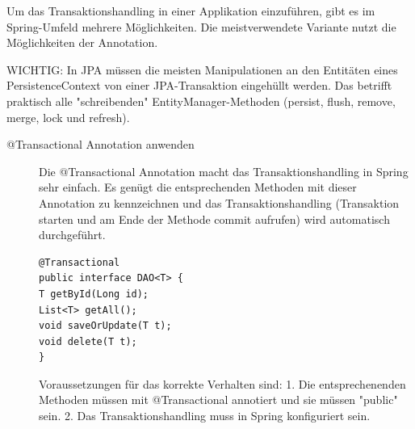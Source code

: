 \documentclass[a4paper,10pt]{scrreprt}
\begin{document}
Um das Transaktionshandling in einer Applikation einzuführen, gibt es im Spring-Umfeld mehrere
Möglichkeiten. Die meistverwendete Variante nutzt die Möglichkeiten der Annotation.
\begin{framed}
WICHTIG: In JPA müssen die meisten Manipulationen an den Entitäten eines PersistenceContext
von einer JPA-Transaktion eingehüllt werden. Das betrifft praktisch alle "schreibenden"
EntityManager-Methoden (persist, flush, remove, merge, lock und refresh).
\end{framed}
\begin{description}

\item[@Transactional Annotation anwenden] Die @Transactional Annotation macht das Transaktionshandling in Spring sehr 
einfach. Es genügt die entsprechenden Methoden mit dieser Annotation zu kennzeichnen und das
Transaktionshandling (Transaktion starten und am Ende der Methode commit aufrufen) wird
automatisch durchgeführt.
\begin{lstlisting}[caption=Transaktional über eine Klasse]
 @Transactional
public interface DAO<T> {
T getById(Long id);
List<T> getAll();
void saveOrUpdate(T t);
void delete(T t);
}
\end{lstlisting}
Voraussetzungen für das korrekte Verhalten sind:
1. Die entsprechenenden Methoden müssen mit @Transactional annotiert und sie müssen
"public" sein.
2. Das Transaktionshandling muss in Spring konfiguriert sein.
\end{description}
\end{document}
